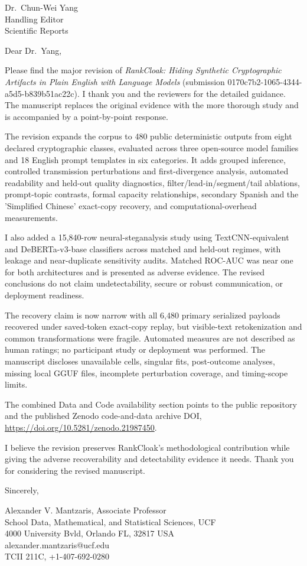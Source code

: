\documentclass[10pt]{letter}
\begin{document}
\begin{letter}{Dr.\ Chun-Wei Yang\\Handling Editor\\Scientific Reports}
\opening{Dear Dr.\ Yang,}

Please find the major revision of \emph{RankCloak: Hiding Synthetic Cryptographic Artifacts in Plain English with Language Models} (submission 0170c7b2-1065-4344-a5d5-b839b51ac22c). I thank you and the reviewers for the detailed guidance. The manuscript replaces the original evidence with the more thorough study and is accompanied by a point-by-point response.

The revision expands the corpus to 480 public deterministic outputs from eight declared cryptographic classes, evaluated across three open-source model families and 18 English prompt templates in six categories. It adds grouped inference, controlled transmission perturbations and first-divergence analysis, automated readability and held-out quality diagnostics, filter/lead-in/segment/tail ablations, prompt-topic contrasts, formal capacity relationships, secondary Spanish and the 'Simplified Chinese' exact-copy recovery, and computational-overhead measurements.

I also added a 15,840-row neural-steganalysis study using TextCNN-equivalent and DeBERTa-v3-base classifiers across matched and held-out regimes, with leakage and near-duplicate sensitivity audits. Matched ROC-AUC was near one for both architectures and is presented as adverse evidence. The revised conclusions do not claim undetectability, secure or robust communication, or deployment readiness.

The recovery claim is now narrow with all 6,480 primary serialized payloads recovered under saved-token exact-copy replay, but visible-text retokenization and common transformations were fragile. Automated measures are not described as human ratings; no participant study or deployment was performed. The manuscript discloses unavailable cells, singular fits, post-outcome analyses, missing local GGUF files, incomplete perturbation coverage, and timing-scope limits.

The combined Data and Code availability section points to the public repository and the published Zenodo code-and-data archive DOI, \url{https://doi.org/10.5281/zenodo.21987450}.

I believe the revision preserves RankCloak's methodological contribution while giving the adverse recoverability and detectability evidence it needs. Thank you for considering the revised manuscript.

Sincerely,

Alexander V. Mantzaris, Associate Professor \\
School Data, Mathematical, and Statistical Sciences, UCF \\
4000 University Bvld, Orlando FL, 32817 USA \\
alexander.mantzaris@ucf.edu \\
TCII 211C, +1-407-692-0280
\end{letter}
\end{document}
